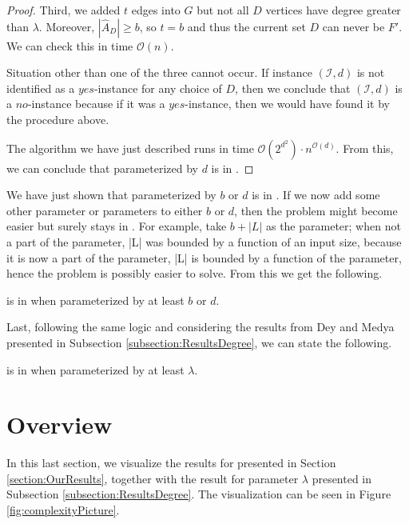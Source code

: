 \begin{proof}
    Third, we added $t$ edges into $G$ but not all $D$ vertices have degree greater than $\lambda$.
    Moreover, $|\hat{A}_D| \geq b$, so $t = b$ and thus the current set $D$ can never be $F'$.
    We can check this in time $\mathcal{O}(n)$.

    Situation other than one of the three cannot occur.
    If instance $(\mathcal{I}, d)$ is not identified as a $yes$-instance for any choice of $D$,
    then we conclude that $(\mathcal{I}, d)$ is a $no$-instance because if it was a $yes$-instance,
    then we would have found it by the procedure above.
    
    The algorithm we have just described runs in time $\mathcal{O}(2^{d^2}) \cdot n^{\mathcal{O}(d)}$.
    From this, we can conclude that \HL parameterized by $d$ is in \XP.
\end{proof}

We have just shown that \HL parameterized by $b$ or $d$ is in \XP.
If we now add some other parameter or parameters to either $b$ or $d$, then the problem
might become easier but surely stays in \XP.
For example, take $b+|L|$ as the parameter;
when not a part of the parameter, |L| was bounded by a function of an input size,
because it is now a part of the parameter, |L| is bounded by a function of the parameter,
hence the problem is possibly easier to solve.
From this we get the following.

\begin{corollary}\label{cor:BD:variation:XP}
    \HL is in \XP when parameterized by at least $b$ or $d$.
\end{corollary}

Last, following the same logic and considering the results from Dey and Medya \cite{Dey2019} presented in Subsection \ref{subsection:ResultsDegree},
we can state the following.

\begin{corollary}\label{cor:Ld:variation:FPT}
    \HL is in \XP when parameterized by at least $\lambda$.
\end{corollary}

\section{Overview}

In this last section, we visualize the results for \HLdeg presented in Section \ref{section:OurResults},
together with the result for parameter $\lambda$ presented in Subsection \ref{subsection:ResultsDegree}.
The visualization can be seen in Figure \ref{fig:complexityPicture}.

